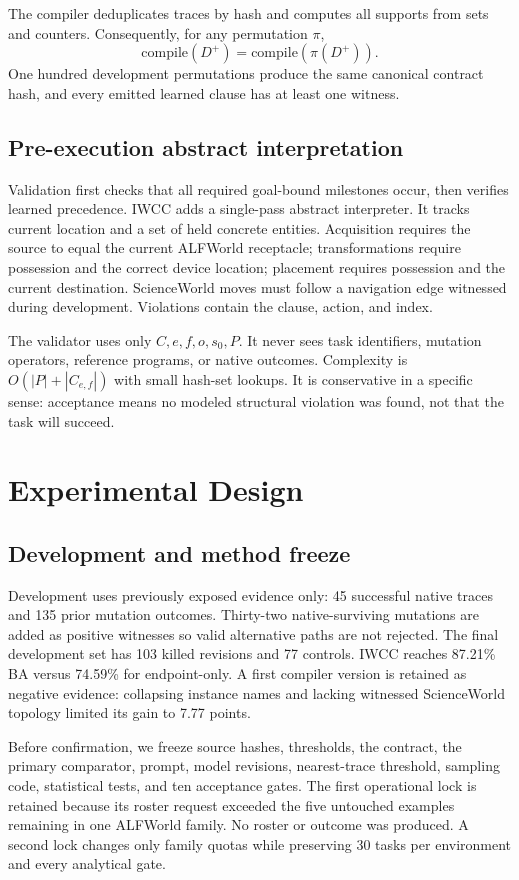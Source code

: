 \documentclass[pdflatex,sn-basic]{sn-jnl}
\begin{document}
The compiler deduplicates traces by hash and computes all supports from sets and counters. Consequently, for any permutation $\pi$,
\[
\mathrm{compile}(D^+)=\mathrm{compile}(\pi(D^+)).
\]
One hundred development permutations produce the same canonical contract hash, and every emitted learned clause has at least one witness.

\subsection{Pre-execution abstract interpretation}
Validation first checks that all required goal-bound milestones occur, then verifies learned precedence. IWCC adds a single-pass abstract interpreter. It tracks current location and a set of held concrete entities. Acquisition requires the source to equal the current ALFWorld receptacle; transformations require possession and the correct device location; placement requires possession and the current destination. ScienceWorld moves must follow a navigation edge witnessed during development. Violations contain the clause, action, and index.

The validator uses only $C,e,f,o,s_0,P$. It never sees task identifiers, mutation operators, reference programs, or native outcomes. Complexity is $O(|P|+|C_{e,f}|)$ with small hash-set lookups. It is conservative in a specific sense: acceptance means no modeled structural violation was found, not that the task will succeed.

\section{Experimental Design}
\subsection{Development and method freeze}
Development uses previously exposed evidence only: 45 successful native traces and 135 prior mutation outcomes. Thirty-two native-surviving mutations are added as positive witnesses so valid alternative paths are not rejected. The final development set has 103 killed revisions and 77 controls. IWCC reaches 87.21\% BA versus 74.59\% for endpoint-only. A first compiler version is retained as negative evidence: collapsing instance names and lacking witnessed ScienceWorld topology limited its gain to 7.77 points.

Before confirmation, we freeze source hashes, thresholds, the contract, the primary comparator, prompt, model revisions, nearest-trace threshold, sampling code, statistical tests, and ten acceptance gates. The first operational lock is retained because its roster request exceeded the five untouched examples remaining in one ALFWorld family. No roster or outcome was produced. A second lock changes only family quotas while preserving 30 tasks per environment and every analytical gate.
\end{document}
